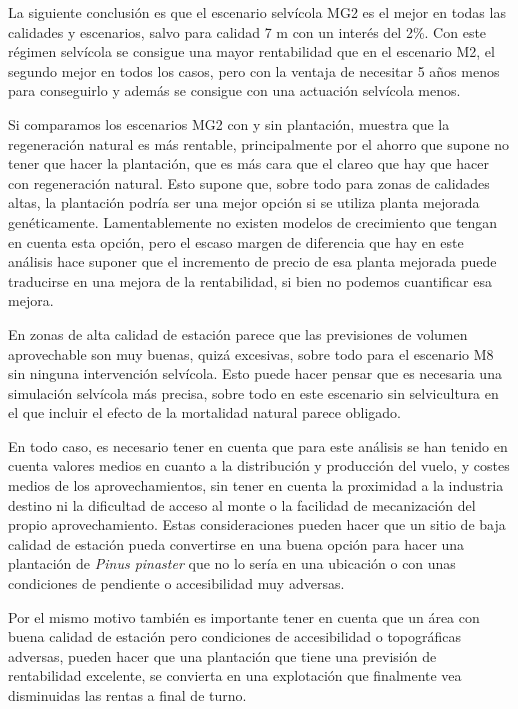 \documentclass[
]{article}
\begin{document}
La siguiente conclusión es que el escenario selvícola MG2 es el mejor en
todas las calidades y escenarios, salvo para calidad 7 m con un interés
del 2\%. Con este régimen selvícola se consigue una mayor rentabilidad
que en el escenario M2, el segundo mejor en todos los casos, pero con la
ventaja de necesitar 5 años menos para conseguirlo y además se consigue
con una actuación selvícola menos.

Si comparamos los escenarios MG2 con y sin plantación, muestra que la
regeneración natural es más rentable, principalmente por el ahorro que
supone no tener que hacer la plantación, que es más cara que el clareo
que hay que hacer con regeneración natural. Esto supone que, sobre todo
para zonas de calidades altas, la plantación podría ser una mejor opción
si se utiliza planta mejorada genéticamente. Lamentablemente no existen
modelos de crecimiento que tengan en cuenta esta opción, pero el escaso
margen de diferencia que hay en este análisis hace suponer que el
incremento de precio de esa planta mejorada puede traducirse en una
mejora de la rentabilidad, si bien no podemos cuantificar esa mejora.

En zonas de alta calidad de estación parece que las previsiones de
volumen aprovechable son muy buenas, quizá excesivas, sobre todo para el
escenario M8 sin ninguna intervención selvícola. Esto puede hacer pensar
que es necesaria una simulación selvícola más precisa, sobre todo en
este escenario sin selvicultura en el que incluir el efecto de la
mortalidad natural parece obligado.

En todo caso, es necesario tener en cuenta que para este análisis se han
tenido en cuenta valores medios en cuanto a la distribución y producción
del vuelo, y costes medios de los aprovechamientos, sin tener en cuenta
la proximidad a la industria destino ni la dificultad de acceso al monte
o la facilidad de mecanización del propio aprovechamiento. Estas
consideraciones pueden hacer que un sitio de baja calidad de estación
pueda convertirse en una buena opción para hacer una plantación de
\emph{Pinus pinaster} que no lo sería en una ubicación o con unas
condiciones de pendiente o accesibilidad muy adversas.

Por el mismo motivo también es importante tener en cuenta que un área
con buena calidad de estación pero condiciones de accesibilidad o
topográficas adversas, pueden hacer que una plantación que tiene una
previsión de rentabilidad excelente, se convierta en una explotación que
finalmente vea disminuidas las rentas a final de turno.
\end{document}
